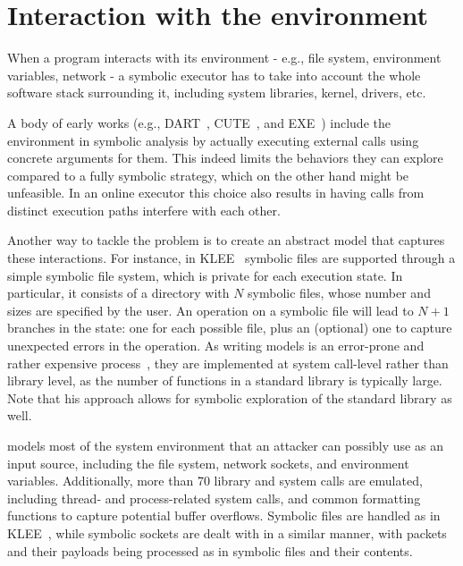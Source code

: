
\section{Interaction with the environment}

When a program interacts with its environment - e.g., file system, environment variables, network - a symbolic executor has to take into account the whole software stack surrounding it, including system libraries, kernel, drivers, etc.

A body of early works (e.g., {\sc DART}~\cite{DART-PLDI05}, {\sc CUTE}~\cite{CUTE-FSE13}, and {\sc EXE}~\cite{EXE-CCS06}) include the environment in symbolic analysis by actually executing external calls using concrete arguments for them. This indeed limits the behaviors they can explore compared to a fully symbolic strategy, which on the other hand might be unfeasible. In an online executor this choice also results in having calls from distinct execution paths interfere with each other. 

Another way to tackle the problem is to create an abstract model that captures these interactions. For instance, in {\sc KLEE}~\cite{KLEE-OSDI08} symbolic files are supported through a simple symbolic file system, which is private for each execution state. In particular, it consists of a directory with $N$ symbolic files, whose number and sizes are specified by the user. An operation on a symbolic file will lead to $N+1$ branches in the state: one for each possible file, plus an (optional) one to capture unexpected errors in the operation. As writing models is an error-prone and rather expensive process~\cite{Ball06}, they are implemented at system call-level rather than library level, as the number of functions in a standard library  is typically large. Note that his approach allows for symbolic exploration of the standard library as well.

\cite{AEG-NDSS11} models most of the system environment that an attacker can possibly use as an input source, including the file system, network sockets, and environment variables. Additionally, more than 70 library and system calls are emulated, including thread- and process-related system calls, and common formatting functions to capture potential buffer overflows. Symbolic files are handled as in {\sc KLEE}~\cite{KLEE-OSDI08}, while symbolic sockets are dealt with in a similar manner, with packets and their payloads being processed as in symbolic files and their contents.

